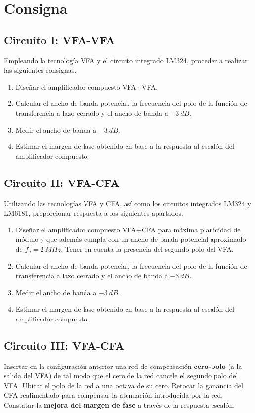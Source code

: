 \newpage
\section{Consigna}
\subsection{Circuito I: VFA-VFA}
\hspace{1mm} Empleando la tecnología VFA y el circuito integrado LM324, proceder a realizar las siguientes consignas.
\begin{enumerate} 
    \item Diseñar el amplificador compuesto VFA+VFA.
    \item Calcular el ancho de banda potencial, la frecuencia del polo de la función de transferencia a lazo cerrado y el ancho de banda a \(-3~dB\).
     \item Medir el ancho de banda a \(-3~dB\).
     \item Estimar el margen de fase obtenido en base a la respuesta al escalón del amplificador compuesto.
\end{enumerate}


\subsection{Circuito II: VFA-CFA}
\hspace{1mm} Utilizando las tecnologías VFA y CFA, así como los circuitos integrados LM324 y LM6181, proporcionar respuesta a los siguientes apartados.

\begin{enumerate}
    \item Diseñar el amplificador compuesto VFA+CFA para máxima planicidad de módulo y que además cumpla con un ancho de banda potencial aproximado de \(f_g=2~MHz\). Tener en cuenta la presencia del segundo polo del VFA.
    \item Calcular el ancho de banda potencial, la frecuencia del polo de la función de transferencia a lazo cerrado y el ancho de banda a \(-3~dB\).
    \item Medir el ancho de banda a \(-3~dB\).
    \item Estimar el margen de fase obtenido en base a la respuesta al escalón del amplificador compuesto.
\end{enumerate}

\subsection{Circuito III: VFA-CFA}
\hspace{1mm} Insertar en la configuración anterior una red de compensación \textbf{cero-polo} (a la salida del VFA) de tal modo que el cero de la red cancele el segundo polo del VFA. Ubicar el polo de la red a una octava de su cero. Retocar la ganancia del CFA realimentado para compensar la atenuación introducida por la red. Constatar la \textbf{mejora del margen de fase} a través de la respuesta escalón. 

